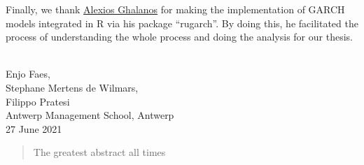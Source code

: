 \documentclass[a4paper, twoside]{templates/ociamthesis}
\begin{document}
\begin{romanpages}
\begin{acknowledgements}
  \noindent Finally, we thank \href{https://www.linkedin.com/in/alexios-galanos-64309165/}{Alexios Ghalanos} for making the implementation of GARCH models integrated in R via his package ``rugarch''. By doing this, he facilitated the process of understanding the whole process and doing the analysis for our thesis. ~\\

  \begin{flushright}
  Enjo Faes, \\
  Stephane Mertens de Wilmars, \\
  Filippo Pratesi \\
  Antwerp Management School, Antwerp \\
  27 June 2021
  \end{flushright}
\end{acknowledgements}


\begin{abstract}
	The greatest abstract all times
\end{abstract}


\flushbottom

\tableofcontents

\listoffigures
	\mtcaddchapter

\listoftables
  \mtcaddchapter


\end{romanpages}

\flushbottom
\end{document}
